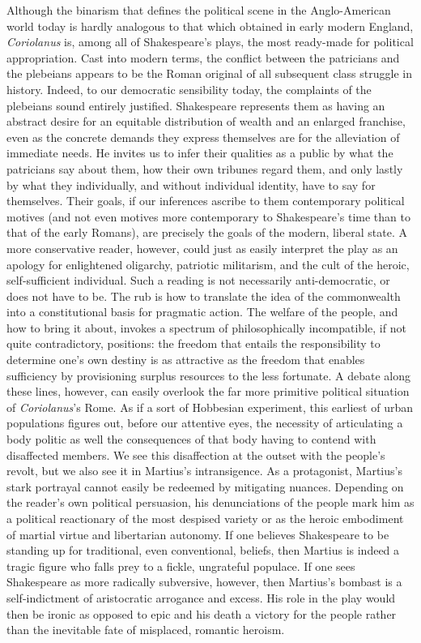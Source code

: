 Although the binarism that defines the political scene in the Anglo-American world today is hardly analogous to that which obtained in early modern England, \emph{Coriolanus} is, among all of Shakespeare's plays, the most ready-made for political appropriation.
Cast into modern terms, the conflict between the patricians and the plebeians appears to be the Roman original of all subsequent class struggle in history.
Indeed, to our democratic sensibility today, the complaints of the plebeians sound entirely justified.
Shakespeare represents them as having an abstract desire for an equitable distribution of wealth and an enlarged franchise, even as the concrete demands they express themselves are for the alleviation of immediate needs.
He invites us to infer their qualities as a public by what the patricians say about them, how their own tribunes regard them, and only lastly by what they individually, and without individual identity, have to say for themselves.
Their goals, if our inferences ascribe to them contemporary political motives (and not even motives more contemporary to Shakespeare's time than to that of the early Romans), are precisely the goals of the modern, liberal state.
A more conservative reader, however, could just as easily interpret the play as an apology for enlightened oligarchy, patriotic militarism, and the cult of the heroic, self-sufficient individual.
Such a reading is not necessarily anti-democratic, or does not have to be.
The rub is how to translate the idea of the commonwealth into a constitutional basis for pragmatic action.
The welfare of the people, and how to bring it about, invokes a spectrum of philosophically incompatible, if not quite contradictory, positions: the freedom that entails the responsibility to determine one's own destiny is as attractive as the freedom that enables sufficiency by provisioning surplus resources to the less fortunate.
A debate along these lines, however, can easily overlook the far more primitive political situation of \emph{Coriolanus}'s Rome.
As if a sort of Hobbesian experiment, this earliest of urban populations figures out, before our attentive eyes, the necessity of articulating a body politic as well the consequences of that body having to contend with disaffected members.
We see this disaffection at the outset with the people's revolt, but we also see it in Martius's intransigence.
As a protagonist, Martius's stark portrayal cannot easily be redeemed by mitigating nuances.
Depending on the reader's own political persuasion, his denunciations of the people mark him as a political reactionary of the most despised variety or as the heroic embodiment of martial virtue and libertarian autonomy.
If one believes Shakespeare to be standing up for traditional, even conventional, beliefs, then Martius is indeed a tragic figure who falls prey to a fickle, ungrateful populace.
If one sees Shakespeare as more radically subversive, however, then Martius's bombast is a self-indictment of aristocratic arrogance and excess.
His role in the play would then be ironic as opposed to epic and his death a victory for the people rather than the inevitable fate of misplaced, romantic heroism.

